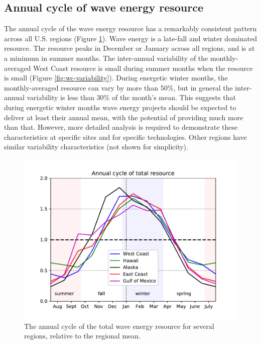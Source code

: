 
\subsection{Annual cycle of wave energy resource}

The annual cycle of the wave energy resource has a remarkably consistent pattern across all U.S. regions (Figure \ref{fig:annual-cycle}). Wave energy is a late-fall and winter dominated resource. The resource peaks in December or January across all regions, and is at a minimum in summer months. The inter-annual variability of the monthly-averaged West Coast resource is small during summer months when the resource is small (Figure \ref{fig:wc-variability}). During energetic winter months, the monthly-averaged resource can vary by more than 50\%, but in general the inter-annual variability is less than 30\% of the month's mean. This suggests that during energetic winter months wave energy projects should be expected to deliver at least their annual mean, with the potential of providing much more than that. However, more detailed analysis is required to demonstrate these characteristics at specific sites and for specific technologies. Other regions have similar variability characteristics (not shown for simplicity).

\begin{figure}[ht]
  \centering
  \includegraphics[width=\textwidth]{../fig/AnnualCycle01.pdf}
  \caption[Wave resource annual cycle.]{The annual cycle of the total wave energy resource for several regions, relative to the regional mean.}
  \label{fig:annual-cycle}
\end{figure}


